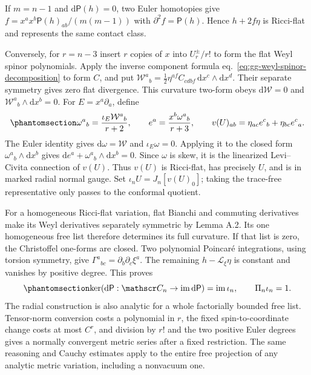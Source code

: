 \documentclass[
  english,
  11pt,
  reqno]{amsart}
\begin{document}
If \(m=n-1\) and \(\mathrm d\mathsf P(h)=0\), two Euler homotopies give
\(f=x^ax^b\mathsf P(h)_{ab}/(m(m-1))\) with
\(\partial^2f=\mathsf P(h)\). Hence \(h+2f\eta\) is Ricci-flat and
represents the same contact class.

Conversely, for \(r=n-3\) insert \(r\) copies of \(x\) into
\(U_r^\pm/r!\) to form the flat Weyl spinor polynomials. Apply the
inverse component formula eq.~\ref{eq:gg-weyl-spinor-decomposition} to
form \(C\), and put
\(\mathcal W^a{}_b=\tfrac12\eta^{af}C_{cdbf}\,\mathrm dx^c\wedge\mathrm dx^d\).
Their separate symmetry gives zero flat divergence. This curvature
two-form obeys \(\mathrm d\mathcal W=0\) and
\(\mathcal W^a{}_b\wedge\mathrm dx^b=0\). For \(E=x^a\partial_a\),
define
\begin{equation}\protect\phantomsection\label{eq:gg-linear-vacuum-radial-homotopy}{
 \omega^a{}_b=\frac{\iota_E\mathcal W^a{}_b}{r+2},\qquad
 e^a=\frac{x^b\omega^a{}_b}{r+3},\qquad
 v(U)_{ab}=\eta_{ac}e^c{}_b+\eta_{bc}e^c{}_a .
}\end{equation} The Euler identity gives \(\mathrm d\omega=\mathcal W\)
and \(\iota_E\omega=0\). Applying it to the closed form
\(\omega^a{}_b\wedge\mathrm dx^b\) gives
\(\mathrm de^a+\omega^a{}_b\wedge\mathrm dx^b=0\). Since \(\omega\) is
skew, it is the linearized Levi--Civita connection of \(v(U)\). Thus
\(v(U)\) is Ricci-flat, has precisely \(U\), and is in marked radial
normal gauge. Set \(\iota_nU=J_n[v(U)_0]\); taking the trace-free
representative only passes to the conformal quotient.

For a homogeneous Ricci-flat variation, flat Bianchi and commuting
derivatives make its Weyl derivatives separately symmetric by Lemma A.2.
Its one homogeneous free list therefore determines its full curvature.
If that list is zero, the Christoffel one-forms are closed. Two
polynomial Poincaré integrations, using torsion symmetry, give
\(\Gamma^a{}_{bc}=\partial_b\partial_c\xi^a\). The remaining
\(h-\mathcal L_\xi\eta\) is constant and vanishes by positive degree.
This proves
\begin{equation}\protect\phantomsection\label{eq:gg-contact-cotton-kernel}{
 \ker(\mathrm d\mathsf P:\mathscr C_n\to\operatorname{im}\mathrm d\mathsf P)
       =\operatorname{im}\iota_n,\qquad \Pi_n\iota_n=1 .
}\end{equation} The radial construction is also analytic for a whole
factorially bounded free list. Tensor-norm conversion costs a polynomial
in \(r\), the fixed spin-to-coordinate change costs at most \(C^r\), and
division by \(r!\) and the two positive Euler degrees gives a normally
convergent metric series after a fixed restriction. The same reasoning
and Cauchy estimates apply to the entire free projection of any analytic
metric variation, including a nonvacuum one.
\end{document}
